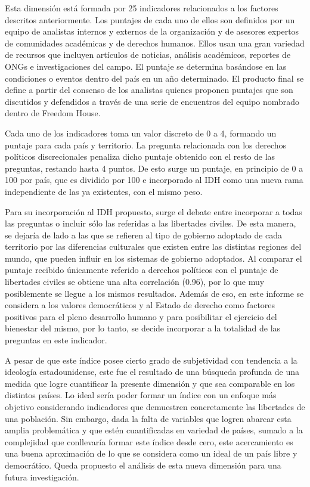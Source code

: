 \documentclass[
  10pt,
]{article}
\begin{document}
Esta dimensión está formada por 25 indicadores relacionados a los
factores descritos anteriormente. Los puntajes de cada uno de ellos son
definidos por un equipo de analistas internos y externos de la
organización y de asesores expertos de comunidades académicas y de
derechos humanos. Ellos usan una gran variedad de recursos que incluyen
artículos de noticias, análisis académicos, reportes de ONGs e
investigaciones del campo. El puntaje se determina basándose en las
condiciones o eventos dentro del país en un año determinado. El producto
final se define a partir del consenso de los analistas quienes proponen
puntajes que son discutidos y defendidos a través de una serie de
encuentros del equipo nombrado dentro de Freedom House.

Cada uno de los indicadores toma un valor discreto de 0 a 4, formando un
puntaje para cada país y territorio. La pregunta relacionada con los
derechos políticos discrecionales penaliza dicho puntaje obtenido con el
resto de las preguntas, restando hasta 4 puntos. De esto surge un
puntaje, en principio de 0 a 100 por país, que es dividido por 100 e
incorporado al IDH como una nueva rama independiente de las ya
existentes, con el mismo peso.

Para su incorporación al IDH propuesto, surge el debate entre incorporar
a todas las preguntas o incluir sólo las referidas a las libertades
civiles. De esta manera, se dejaría de lado a las que se refieren al
tipo de gobierno adoptado de cada territorio por las diferencias
culturales que existen entre las distintas regiones del mundo, que
pueden influir en los sistemas de gobierno adoptados. Al comparar el
puntaje recibido únicamente referido a derechos políticos con el puntaje
de libertades civiles se obtiene una alta correlación (0.96), por lo que
muy posiblemente se llegue a los mismos resultados. Además de eso, en
este informe se considera a los valores democráticos y al Estado de
derecho como factores positivos para el pleno desarrollo humano y para
posibilitar el ejercicio del bienestar del mismo, por lo tanto, se
decide incorporar a la totalidad de las preguntas en este indicador.

A pesar de que este índice posee cierto grado de subjetividad con
tendencia a la ideología estadounidense, este fue el resultado de una
búsqueda profunda de una medida que logre cuantificar la presente
dimensión y que sea comparable en los distintos países. Lo ideal sería
poder formar un índice con un enfoque más objetivo considerando
indicadores que demuestren concretamente las libertades de una
población. Sin embargo, dada la falta de variables que logren abarcar
esta amplia problemática y que estén cuantificadas en variedad de
países, sumado a la complejidad que conllevaría formar este índice desde
cero, este acercamiento es una buena aproximación de lo que se considera
como un ideal de un país libre y democrático. Queda propuesto el
análisis de esta nueva dimensión para una futura investigación.
\end{document}
